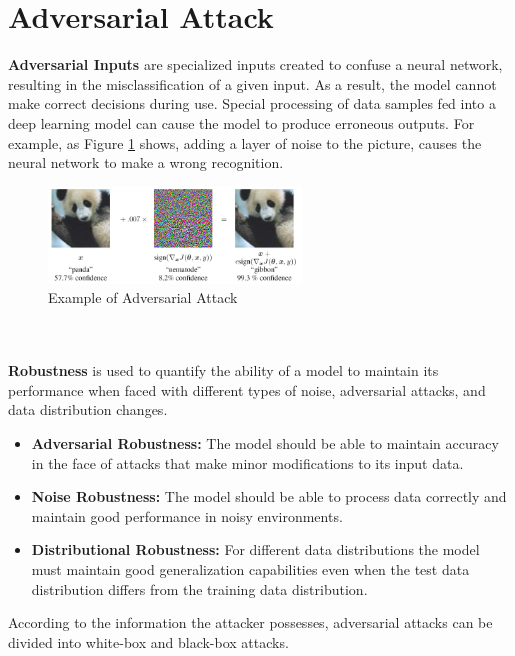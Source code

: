 \documentclass[english,version-2022-01]{uzl-thesis}
\begin{document}
\section{Adversarial Attack} \textbf{Adversarial Inputs} are specialized inputs created to confuse a neural network, resulting in the misclassification of a given input.\cite{goodfellow2015explaining} As a result, the model cannot make correct decisions during use. Special processing of data samples fed into a deep learning model can cause the model to produce erroneous outputs. For example, as Figure \ref{Example of Adversarial Attack} shows, adding a layer of noise to the picture, causes the neural network to make a wrong recognition.\\
\begin{figure}[htpb]
  \centering
  \includegraphics[width=0.6\textwidth]{pic/panda.png}
  \caption{Example of Adversarial Attack\cite{goodfellow2015explaining}}
  \label{Example of Adversarial Attack}
\end{figure}\\
\\
\textbf{Robustness} is used to quantify the ability of a model to maintain its performance when faced with different types of noise, adversarial attacks, and data distribution changes. \cite{fawzi2016robustness}
\begin{itemize}
    \item \textbf{Adversarial Robustness:} The model should be able to maintain accuracy in the face of attacks that make minor modifications to its input data.\cite{fawzi2016robustness}
    \item \textbf{Noise Robustness:} The model should be able to process data correctly and maintain good performance in noisy environments.\cite{fawzi2016robustness}
    \item \textbf{Distributional Robustness:} For different data distributions the model must maintain good generalization capabilities even when the test data distribution differs from the training data distribution.\cite{derman2020distributional}
\end{itemize}
According to the information the attacker possesses, adversarial attacks can be divided into white-box and black-box attacks. 
\end{document}

